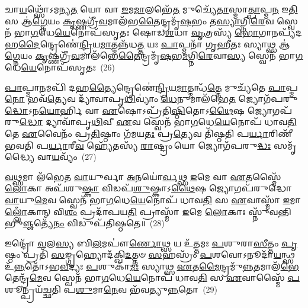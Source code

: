 𑌚𑌾\-\ul{𑌯}\-𑌥𑍍𑌸𑍋᳴\-𑌽𑌮𑌨𑍍𑌯\-\ul{𑌤} 𑌯𑍋 𑌵𑌾 \ul{𑌇}\-𑌮\-\ul{𑌮𑌾}\-𑌲𑌭𑍇᳴\-\ul{𑌤} 𑌮𑍁𑌚𑍍𑌯𑍇᳴\-\ul{𑌤𑌾}\-𑌸𑍍𑌮𑌾\-\ul{𑌤𑍍𑌪𑌾}\-\-𑌪𑍍𑌮\-\ul{𑌨} 𑌇\-\ul{𑌤𑌿} 𑌸 𑌆॑\-\ul{𑌗𑍍𑌨𑍇}\-𑌯𑌂 \ul{𑌕𑍃}\-𑌷𑍍𑌣𑌗𑍍𑌰𑍀᳴\-\ul{𑌵}\-𑌮𑌾𑌲᳴𑌭\-\ul{𑌤𑍈}\-𑌨𑍍𑌦𑍍𑌰𑌮𑍃᳴\-\ul{𑌷}\-𑌭𑌂 𑌤\-\ul{𑌸𑍍𑌯𑌾}\-𑌗𑍍𑌨𑌿\-\ul{𑌰𑍇}\-𑌵 𑌸𑍍𑌵𑍇𑌨᳴ 𑌭𑌾\-\ul{𑌗}\-𑌧𑍇\-\ul{𑌯𑍇}\-𑌨𑍋𑌪᳴𑌸𑍃𑌤𑌃 𑌷𑍋𑌡\-\ul{𑌶}\-𑌧𑌾 \ul{𑌵𑍃}\-𑌤𑍍𑌰𑌸𑍍𑌯᳴ \ul{𑌭𑍋}\-𑌗𑌾𑌨𑌪𑍍𑌯᳴𑌦𑌹\-\-\ul{𑌦𑍈}\-𑌨𑍍𑌦𑍍𑌰𑍇𑌣𑍇॑\-\ul{𑌨𑍍𑌦𑍍𑌰𑌿}\-𑌯\-\-\ul{𑌮𑌾}\-𑌤𑍍𑌮𑌨𑍍𑌨᳴𑌧\-\ul{𑌤𑍍𑌤} 𑌯𑌃 \ul{𑌪𑌾}\-𑌪𑍍𑌮𑌨𑌾᳴ 𑌗𑍃\-\ul{𑌹𑍀}\-𑌤𑌃 𑌸𑍍𑌯𑌾𑌥𑍍𑌸 𑌆॑\-\ul{𑌗𑍍𑌨𑍇}\-𑌯𑌂 \ul{𑌕𑍃}\-𑌷𑍍𑌣𑌗𑍍𑌰𑍀᳴\-\ul{𑌵}\-𑌮𑌾𑌲᳴𑌭𑍇\-\ul{𑌤𑍈}\-𑌨𑍍𑌦𑍍𑌰𑌮𑍃᳴\-\ul{𑌷}\-𑌭\-\ul{𑌮}\-𑌗𑍍𑌨𑌿\-\ul{𑌰𑍇}\-𑌵𑌾\-\ul{𑌸𑍍𑌯} 𑌸𑍍𑌵𑍇𑌨᳴ 𑌭𑌾\-\ul{𑌗}\-𑌧𑍇\-\ul{𑌯𑍇}\-𑌨𑍋𑌪᳴𑌸𑍃𑌤𑌃~(26)

\-\ul{𑌪𑌾}\-𑌪𑍍𑌮𑌾\-\ul{𑌨}\-𑌮𑌪𑌿᳴ 𑌦𑌹\-\ul{𑌤𑍍𑌯𑍈}\-𑌨𑍍𑌦𑍍𑌰𑍇𑌣𑍇॑\-\ul{𑌨𑍍𑌦𑍍𑌰𑌿}\-𑌯\-\ul{𑌮𑌾}\-𑌤𑍍𑌮𑌨𑍍𑌧᳴\-\ul{𑌤𑍍𑌤𑍇} 𑌮𑍁𑌚𑍍𑌯᳴𑌤𑍇 \ul{𑌪𑌾}\-𑌪𑍍𑌮\-\ul{𑌨𑍋} 𑌭𑌵᳴\-\ul{𑌤𑍍𑌯𑍇}\-𑌵 𑌦𑍍𑌯𑌾᳴𑌵𑌾𑌪𑍃\-\ul{𑌥𑌿}\-𑌵𑍍𑌯𑌾𑌂॑ \ul{𑌧𑍇}\-𑌨𑍁𑌮𑌾\-𑌲᳴𑌭𑍇\-\ul{𑌤} 𑌜𑍍𑌯𑍋𑌗᳴𑌪𑌰𑍁\-\ul{𑌦𑍍𑌧𑍋}\-\-𑌽𑌨\-\ul{𑌯𑍋}\-𑌰𑍍\mbox{}𑌹𑌿 𑌵𑌾 \ul{𑌏}\-𑌷𑍋\-𑌽𑌪𑍍𑌰᳴𑌤𑌿\-\ul{𑌷𑍍𑌠𑌿}\-𑌤𑍋\-𑌽\-\ul{𑌥𑍈}\-𑌷 𑌜𑍍𑌯𑍋𑌗𑌪᳴𑌰𑍁\-\ul{𑌦𑍍𑌧𑍋} 𑌦𑍍𑌯𑌾𑌵𑌾᳴𑌪𑍃\-\ul{𑌥𑌿}\-𑌵𑍀 \ul{𑌏}\-𑌵 𑌸𑍍𑌵𑍇𑌨᳴ 𑌭𑌾\-\ul{𑌗}\-𑌧𑍇\-\ul{𑌯𑍇}\-𑌨𑍋𑌪᳴ 𑌧𑌾𑌵\-\ul{𑌤𑌿} 𑌤𑍇 \ul{𑌏}\-𑌵𑍈𑌨𑌂᳴ 𑌪𑍍𑌰\-\ul{𑌤𑌿}\-𑌷𑍍𑌠𑌾𑌂 𑌗᳴𑌮𑌯\-\ul{𑌤𑌃} 𑌪𑍍𑌰\-\ul{𑌤𑍍𑌯𑍇}\-𑌵 𑌤𑌿᳴𑌷𑍍𑌠𑌤𑌿 𑌪\-\ul{𑌰𑍍𑌯𑌾}\-𑌰𑌿𑌣𑍀᳴ 𑌭𑌵𑌤𑌿 𑌪\-\ul{𑌰𑍍𑌯𑌾}\-𑌰𑍀\-\ul{𑌵} 𑌹𑍍𑌯𑍇᳴𑌤𑌸𑍍𑌯᳴ \ul{𑌰𑌾}\-𑌷𑍍𑌟𑍍𑌰𑌂 𑌯𑍋 𑌜𑍍𑌯𑍋𑌗᳴𑌪𑌰𑍁\-\ul{𑌦𑍍𑌧𑌃} 𑌸𑌮𑍃᳴𑌦𑍍𑌧𑍍𑌯𑍈 𑌵𑌾\-\ul{𑌯}\-𑌵𑍍𑌯𑌂᳴~(27)

\-\ul{𑌵}\-𑌥𑍍𑌸𑌮𑌾 𑌲᳴𑌭𑍇𑌤 \ul{𑌵𑌾}\-𑌯𑍁𑌰𑍍𑌵𑌾 \ul{𑌅}\-𑌨𑌯𑍋॑\-\ul{𑌰𑍍𑌵}\-𑌥𑍍𑌸 \ul{𑌇}\-𑌮𑍇 𑌵𑌾 \ul{𑌏}\-𑌤𑌸𑍍𑌮𑍈᳴ \ul{𑌲𑍋}\-𑌕𑌾 𑌅𑌪᳴𑌶𑍁\-\ul{𑌷𑍍𑌕𑌾} 𑌵𑌿𑌡𑌪᳴\-\ul{𑌶𑍁}\-𑌷𑍍𑌕𑌾\-𑌽\-\ul{𑌥𑍈}\-𑌷 𑌜𑍍𑌯𑍋𑌗𑌪᳴𑌰𑍁𑌦𑍍𑌧𑍋 \ul{𑌵𑌾}\-𑌯𑍁\-\ul{𑌮𑍇}\-𑌵 𑌸𑍍𑌵𑍇𑌨᳴ 𑌭𑌾\-\ul{𑌗}\-𑌧𑍇\-\ul{𑌯𑍇}\-𑌨𑍋𑌪᳴ 𑌧𑌾𑌵\-\ul{𑌤𑌿} 𑌸 \ul{𑌏}\-𑌵𑌾𑌸𑍍𑌮𑌾᳴ \ul{𑌇}\-𑌮𑌾\-\ul{𑌲𑍍𑌲𑍋𑌁}\-𑌕𑌾𑌨𑍍 𑌵𑌿\-\ul{𑌶𑌂} 𑌪𑍍𑌰𑌦𑌾᳴𑌪𑌯\-\ul{𑌤𑌿} 𑌪𑍍𑌰𑌾𑌸𑍍𑌮𑌾᳴ \ul{𑌇}\-𑌮𑍇 \ul{𑌲𑍋}\-𑌕𑌾𑌃 𑌸𑍍𑌨𑍁᳴𑌵𑌨𑍍𑌤𑌿 𑌭𑍁\-\ul{𑌞𑍍𑌜}\-𑌤𑍍𑌯𑍇᳴\-\ul{𑌨𑌂} 𑌵𑌿𑌡𑍁𑌪᳴𑌤𑌿𑌷𑍍𑌠𑌤𑍇॥~(28)

{\anuvakamend[{\-\ul{𑌮}\-𑌧𑍍𑌯𑌨𑍍𑌦𑌿᳴\-\ul{𑌨𑍇} 𑌕𑌦𑍍𑌰𑍁𑌂᳴ \ul{𑌯}\-𑌮\-\ul{𑌸𑍍𑌯} 𑌸𑍍𑌪𑌰𑍍𑌧᳴𑌮𑌾𑌨𑍋 𑌵𑍈𑌷𑍍𑌣𑌾𑌵\-\ul{𑌰𑍁}\-𑌣𑍀𑌨𑍍𑌤𑌮𑌿𑌨𑍍𑌦𑍍𑌰𑍋॑\-𑌽\-\ul{𑌸𑍍𑌯} 𑌸𑍍𑌵𑍇𑌨᳴ 𑌭𑌾\-\ul{𑌗}\-𑌧𑍇\-\ul{𑌯𑍇}\-𑌨𑍋𑌪᳴𑌸𑍃𑌤𑍋 𑌵𑌾\-\ul{𑌯}\-𑌵𑍍𑌯𑌂᳴ 𑌦𑍍𑌵𑌿𑌚᳴𑌤𑍍𑌵𑌾𑌰𑌿𑍞𑌶𑌚𑍍𑌚।~(4)।}]}

𑌇𑌨𑍍𑌦𑍍𑌰𑍋᳴ \ul{𑌵}\-𑌲\-\ul{𑌸𑍍𑌯} 𑌬𑌿\-\ul{𑌲}\-𑌮𑌪𑍗॑\-\ul{𑌰𑍍𑌣𑍋}\-𑌥𑍍𑌸 𑌯 𑌉᳴\-\ul{𑌤𑍍𑌤}\-𑌮𑌃 \ul{𑌪}\-𑌶𑍁𑌰𑌾\-\ul{𑌸𑍀}\-𑌤𑍍𑌤𑌂 \ul{𑌪𑍃}\-𑌷𑍍𑌠𑌂 𑌪𑍍𑌰𑌤𑌿᳴ \ul{𑌸}\-𑌙𑍍𑌗𑍃𑌹𑍍𑌯𑍋𑌦᳴𑌕𑍍𑌖𑌿\-\ul{𑌦}\-𑌤𑍍𑌤𑍞 \ul{𑌸}\-𑌹𑌸𑍍𑌰𑌂᳴ \ul{𑌪}\-𑌶𑌵𑍋\-𑌽𑌨𑍂𑌦𑌾᳴\-\ul{𑌯}\-𑌨𑍍𑌥𑍍𑌸 𑌉᳴\-\ul{𑌨𑍍𑌨}\-𑌤𑍋᳴\-𑌽𑌭\-\ul{𑌵}\-𑌦𑍍𑌯𑌃 \ul{𑌪}\-𑌶𑍁𑌕𑌾᳴\-\ul{𑌮𑌃} 𑌸𑍍𑌯𑌾𑌥𑍍𑌸 \ul{𑌏}\-𑌤\-\ul{𑌮𑍈}\-𑌨𑍍𑌦𑍍𑌰𑌮𑍁᳴\-\ul{𑌨𑍍𑌨}\-𑌤𑌮𑌾𑌲᳴\-\ul{𑌭𑍇}\-𑌤𑍇𑌨𑍍𑌦𑍍𑌰᳴\-\ul{𑌮𑍇}\-𑌵 𑌸𑍍𑌵𑍇𑌨᳴ 𑌭𑌾\-\ul{𑌗}\-𑌧𑍇\-\ul{𑌯𑍇}\-𑌨𑍋𑌪᳴ 𑌧𑌾𑌵\-\ul{𑌤𑌿} 𑌸 \ul{𑌏}\-𑌵𑌾𑌸𑍍𑌮𑍈᳴ \ul{𑌪}\-𑌶𑍂𑌨𑍍𑌪𑍍𑌰𑌯᳴𑌚𑍍𑌛𑌤𑌿 𑌪\-\ul{𑌶𑍁}\-𑌮𑌾\-\ul{𑌨𑍇}\-𑌵 𑌭᳴𑌵𑌤𑍍𑌯𑍁\-\ul{𑌨𑍍𑌨}\-𑌤𑍋~(29)

